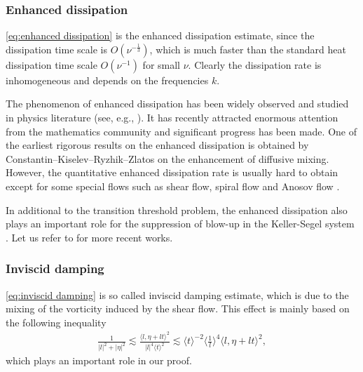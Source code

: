 \documentclass[reqno, 12pt]{amsart} %
\theoremstyle{plain} %
\theoremstyle{definition}
\theoremstyle{remark}
\numberwithin{equation}{section} %
\begin{document}
	\subsubsection{Enhanced dissipation}
	\eqref{eq:enhanced dissipation} is the enhanced dissipation estimate, since the dissipation time scale is $O\left(\nu^{-\frac{1}{3}}\right)$, which is much faster than the standard heat dissipation time scale $O\left(\nu^{-1}\right)$ for small $\nu$. Clearly the dissipation rate is inhomogeneous and depends on the frequencies $k$. 
	
	The phenomenon of enhanced dissipation has been widely observed and studied in physics literature (see, e.g., \cite{BL1994,LB2001,RY1983,T1887}). It has recently attracted enormous attention from the mathematics community and significant progress has been made. One of the earliest rigorous results on the enhanced dissipation is obtained by Constantin--Kiselev--Ryzhik--Zlatos \cite{CKRZ2008} on the enhancement of diffusive mixing. However, the quantitative enhanced dissipation rate is usually hard to obtain except for some special flows such as shear flow, spiral flow and Anosov flow \cite{ZDE2020}.
	
	In additional to the transition threshold problem, the enhanced dissipation also plays an important role for the suppression of blow-up in the Keller-Segel system \cite{BH2017,KX2016}. Let us refer to \cite{CW2024,CWWW2025} for more recent works.
	
	\subsubsection{Inviscid damping}
	\eqref{eq:inviscid damping} is so called inviscid damping estimate, which is due to the mixing of the vorticity
	induced by the shear flow. This effect is mainly based on the following inequality
	\begin{equation*}\begin{aligned}
			\frac{1}{|l|^2+|\eta|^2} \lesssim \frac{\langle l, \eta+l t\rangle^2}{|l|^4\langle t\rangle^2} \lesssim\langle t\rangle^{-2}\langle\frac{1}{l}\rangle^4\langle l, \eta+l t\rangle^2,
	\end{aligned}\end{equation*}
	which plays an important role in our proof. 
	
\end{document}
